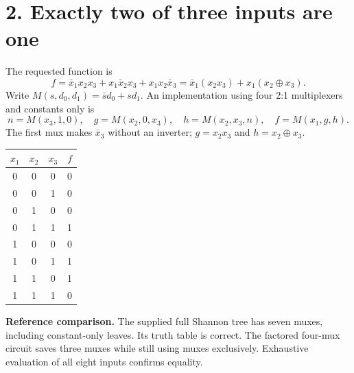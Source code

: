 \documentclass[11pt,a4paper]{article}
\begin{document}
\section*{2. Exactly two of three inputs are one}
The requested function is
\[
 f=\bar x_1x_2x_3+x_1\bar x_2x_3+x_1x_2\bar x_3
   =\bar x_1(x_2x_3)+x_1(x_2\oplus x_3).
\]
Write $M(s,d_0,d_1)=\bar s d_0+s d_1$. An implementation using four 2:1 multiplexers and constants only is
\[
 n=M(x_3,1,0),\quad g=M(x_2,0,x_3),\quad
 h=M(x_2,x_3,n),\quad \boxed{f=M(x_1,g,h).}
\]
The first mux makes $\bar x_3$ without an inverter; $g=x_2x_3$ and $h=x_2\oplus x_3$.
\begin{center}
\end{center}
\begin{center}\begin{tabular}{ccc|c}\toprule
$x_1$&$x_2$&$x_3$&$f$\\\midrule
0&0&0&0\\0&0&1&0\\0&1&0&0\\0&1&1&1\\
1&0&0&0\\1&0&1&1\\1&1&0&1\\1&1&1&0\\\bottomrule
\end{tabular}\end{center}
\textbf{Reference comparison.} The supplied full Shannon tree has seven muxes, including constant-only leaves. Its truth table is correct. The factored four-mux circuit saves three muxes while still using muxes exclusively. Exhaustive evaluation of all eight inputs confirms equality.
\newpage
\end{document}
